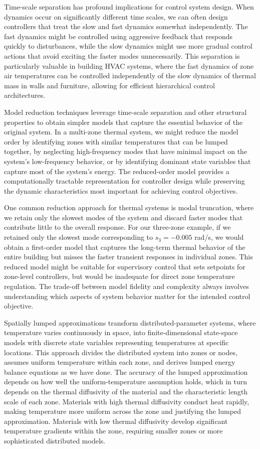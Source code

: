 Time-scale separation has profound implications for control system design. When dynamics occur on significantly different time scales, we can often design controllers that treat the slow and fast dynamics somewhat independently. The fast dynamics might be controlled using aggressive feedback that responds quickly to disturbances, while the slow dynamics might use more gradual control actions that avoid exciting the faster modes unnecessarily. This separation is particularly valuable in building HVAC systems, where the fast dynamics of zone air temperatures can be controlled independently of the slow dynamics of thermal mass in walls and furniture, allowing for efficient hierarchical control architectures.

Model reduction techniques leverage time-scale separation and other structural properties to obtain simpler models that capture the essential behavior of the original system. In a multi-zone thermal system, we might reduce the model order by identifying zones with similar temperatures that can be lumped together, by neglecting high-frequency modes that have minimal impact on the system's low-frequency behavior, or by identifying dominant state variables that capture most of the system's energy. The reduced-order model provides a computationally tractable representation for controller design while preserving the dynamic characteristics most important for achieving control objectives.

One common reduction approach for thermal systems is modal truncation, where we retain only the slowest modes of the system and discard faster modes that contribute little to the overall response. For our three-zone example, if we retained only the slowest mode corresponding to $s_3 = -0.005$ rad/s, we would obtain a first-order model that captures the long-term thermal behavior of the entire building but misses the faster transient responses in individual zones. This reduced model might be suitable for supervisory control that sets setpoints for zone-level controllers, but would be inadequate for direct zone temperature regulation. The trade-off between model fidelity and complexity always involves understanding which aspects of system behavior matter for the intended control objective.

Spatially lumped approximations transform distributed-parameter systems, where temperature varies continuously in space, into finite-dimensional state-space models with discrete state variables representing temperatures at specific locations. This approach divides the distributed system into zones or nodes, assumes uniform temperature within each zone, and derives lumped energy balance equations as we have done. The accuracy of the lumped approximation depends on how well the uniform-temperature assumption holds, which in turn depends on the thermal diffusivity of the material and the characteristic length scale of each zone. Materials with high thermal diffusivity conduct heat rapidly, making temperature more uniform across the zone and justifying the lumped approximation. Materials with low thermal diffusivity develop significant temperature gradients within the zone, requiring smaller zones or more sophisticated distributed models.


